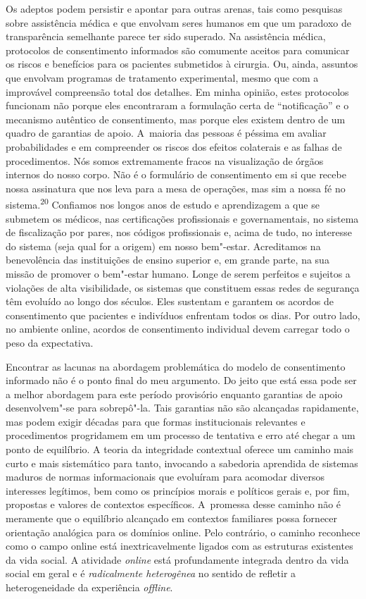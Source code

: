 Os adeptos podem persistir e apontar para outras arenas, tais como
pesquisas sobre assistência médica e que envolvam seres humanos em que
um paradoxo de transparência semelhante parece ter sido superado. Na
assistência médica, protocolos de consentimento informados são comumente
aceitos para comunicar os riscos e benefícios para os pacientes
submetidos à cirurgia. Ou, ainda, assuntos que envolvam programas de
tratamento experimental, mesmo que com a improvável compreensão total
dos detalhes. Em minha opinião, estes protocolos funcionam não porque
eles encontraram a formulação certa de ``notificação'' e o mecanismo
autêntico de consentimento, mas porque eles existem dentro de um quadro
de garantias de apoio. A~maioria das pessoas é péssima em avaliar
probabilidades e em compreender os riscos dos efeitos colaterais e as
falhas de procedimentos. Nós somos extremamente fracos na visualização
de órgãos internos do nosso corpo. Não é o formulário de consentimento
em si que recebe nossa assinatura que nos leva para a mesa de operações,
mas sim a nossa fé no sistema.\textsuperscript{{20}} Confiamos nos
longos anos de estudo e aprendizagem a que se submetem os médicos, nas
certificações profissionais e governamentais, no sistema de fiscalização
por pares, nos códigos profissionais e, acima de tudo, no interesse do
sistema (seja qual for a origem) em nosso bem"-estar. Acreditamos na
benevolência das instituições de ensino superior e, em grande parte, na
sua missão de promover o bem"-estar humano. Longe de serem perfeitos e
sujeitos a violações de alta visibilidade, os sistemas que constituem
essas redes de segurança têm evoluído ao longo dos séculos. Eles
sustentam e garantem os acordos de consentimento que pacientes e
indivíduos enfrentam todos os dias. Por outro lado, no ambiente online,
acordos de consentimento individual devem carregar todo o peso da
expectativa.

Encontrar as lacunas na abordagem problemática do modelo de
consentimento informado não é o ponto final do meu argumento. Do jeito
que está essa pode ser a melhor abordagem para este período provisório
enquanto garantias de apoio desenvolvem"-se para sobrepô"-la. Tais
garantias não são alcançadas rapidamente, mas podem exigir décadas para
que formas institucionais relevantes e procedimentos progridamem em um
processo de tentativa e erro até chegar a um ponto de equilíbrio. A
teoria da integridade contextual oferece um caminho mais curto e mais
sistemático para tanto, invocando a sabedoria aprendida de sistemas
maduros de normas informacionais que evoluíram para acomodar diversos
interesses legítimos, bem como os princípios morais e políticos gerais
e, por fim, propostas e valores de contextos específicos. A~promessa
desse caminho não é meramente que o equilíbrio alcançado em contextos
familiares possa fornecer orientação analógica para os domínios online.
Pelo contrário, o caminho reconhece como o campo online está
inextricavelmente ligados com as estruturas existentes da vida social. A
atividade \emph{online} está profundamente integrada dentro da vida
social em geral e é \emph{radicalmente heterogênea} no sentido de
refletir a heterogeneidade da experiência \emph{offline}.

